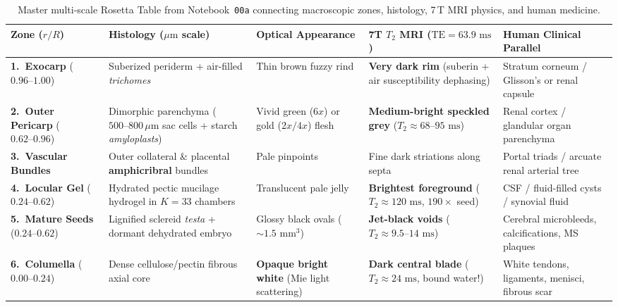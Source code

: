\documentclass[10.5pt,a4paper]{article}
\begin{document}
\begin{table}[H]
\centering
\scriptsize
\renewcommand{\arraystretch}{1.18}
\begin{tabularx}{\textwidth}{L{2.25cm} L{2.3cm} L{3.1cm} L{2.85cm} Y}
\toprule
{}
\textbf{Zone ($r/R$)} & \textbf{Histology ($\mu\text{m}$ scale)} & \textbf{Optical Appearance} & \textbf{7T $T_2$ MRI ($\text{TE}=63.9\text{ ms}$)} & \textbf{Human Clinical Parallel} \\
\midrule
\textbf{1.\ Exocarp} ($0.96\text{--}1.00$) & Suberized periderm + air-filled \emph{trichomes} & Thin brown fuzzy rind & \textbf{Very dark rim} (suberin + air susceptibility dephasing) & Stratum corneum / Glisson's or renal capsule \\
\textbf{2.\ Outer Pericarp} ($0.62\text{--}0.96$) & Dimorphic parenchyma ($500\text{--}800\,\mu\text{m}$ sac cells + starch \emph{amyloplasts}) & Vivid green ($6x$) or gold ($2x/4x$) flesh & \textbf{Medium-bright speckled grey} ($T_2 \approx 68\text{--}95\text{ ms}$) & Renal cortex / glandular organ parenchyma \\
\textbf{3.\ Vascular Bundles} & Outer collateral \& placental \textbf{amphicribral} bundles \cite{guo2013} & Pale pinpoints & Fine dark striations along septa & Portal triads / arcuate renal arterial tree \\
\textbf{4.\ Locular Gel} ($0.24\text{--}0.62$) & Hydrated pectic mucilage hydrogel in $K=33$ chambers & Translucent pale jelly & \textbf{Brightest foreground} ($T_2 \approx 120\text{ ms}$, $190\times$ seed) & CSF / fluid-filled cysts / synovial fluid \\
\textbf{5.\ Mature Seeds} ($0.24\text{--}0.62$) & Lignified sclereid \emph{testa} + dormant dehydrated embryo & Glossy black ovals ($\sim 1.5\text{ mm}^3$) & \textbf{Jet-black voids} ($T_2 \approx 9.5\text{--}14\text{ ms}$) & Cerebral microbleeds, calcifications, MS plaques \\
\textbf{6.\ Columella} ($0.00\text{--}0.24$) & Dense cellulose/pectin fibrous axial core & \textbf{Opaque bright white} (Mie light scattering) & \textbf{Dark central blade} ($T_2 \approx 24\text{ ms}$, bound water!) & White tendons, ligaments, menisci, fibrous scar \\
\bottomrule
\end{tabularx}
\caption{Master multi-scale Rosetta Table from Notebook~\texttt{00a} connecting macroscopic zones, histology, 7\,T MRI physics, and human medicine.}
\label{tab:atlas-rosetta}
\end{table}
\end{document}
